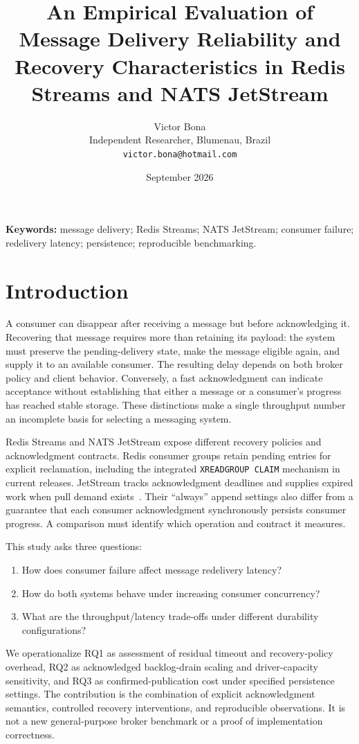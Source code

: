 \documentclass[11pt]{article}
\title{An Empirical Evaluation of Message Delivery Reliability and Recovery Characteristics in Redis Streams and NATS JetStream}
\author{Victor Bona\\[2pt]
\small Independent Researcher, Blumenau, Brazil\\
\small \texttt{victor.bona@hotmail.com}}
\date{September 2026}
\theoremstyle{definition}
\newcommand{\code}[1]{\texttt{#1}}
\begin{document}
\maketitle


\noindent\textbf{Keywords:} message delivery; Redis Streams; NATS JetStream; consumer failure; redelivery latency; persistence; reproducible benchmarking.

\section{Introduction}\label{sec:intro}

A consumer can disappear after receiving a message but before acknowledging it. Recovering that message requires more than retaining its payload: the system must preserve the pending-delivery state, make the message eligible again, and supply it to an available consumer. The resulting delay depends on both broker policy and client behavior. Conversely, a fast acknowledgment can indicate acceptance without establishing that either a message or a consumer's progress has reached stable storage. These distinctions make a single throughput number an incomplete basis for selecting a messaging system.

Redis Streams and NATS JetStream expose different recovery policies and acknowledgment contracts. Redis consumer groups retain pending entries for explicit reclamation, including the integrated \code{XREADGROUP CLAIM} mechanism in current releases. JetStream tracks acknowledgment deadlines and supplies expired work when pull demand exists~\cite{redis742stream,redis8102stream,nats21024consumer,nats2150consumer}. Their ``always'' append settings also differ from a guarantee that each consumer acknowledgment synchronously persists consumer progress. A comparison must identify which operation and contract it measures.

This study asks three questions:
\begin{enumerate}[label=\textbf{RQ\arabic*:},leftmargin=3.5em]
\item How does consumer failure affect message redelivery latency?
\item How do both systems behave under increasing consumer concurrency?
\item What are the throughput/latency trade-offs under different durability configurations?
\end{enumerate}

We operationalize RQ1 as assessment of residual timeout and recovery-policy overhead, RQ2 as acknowledged backlog-drain scaling and driver-capacity sensitivity, and RQ3 as confirmed-publication cost under specified persistence settings. The contribution is the combination of explicit acknowledgment semantics, controlled recovery interventions, and reproducible observations. It is not a new general-purpose broker benchmark or a proof of implementation correctness.
\end{document}
